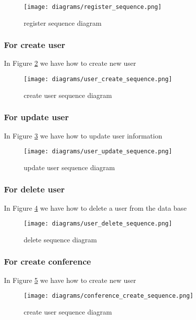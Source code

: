 		\begin{figure}[b]
			\centering
			\texttt{[image: diagrams/register\_sequence.png]}
			\caption{register sequence diagram}
			\label{fig:register-s-d}
		\end{figure}
	
	\subsubsection{For create user}
	In Figure \ref{fig:user-create-s-d} we have how to create new user
	
		\begin{figure}[b]
			\centering
			\texttt{[image: diagrams/user\_create\_sequence.png]}
			\caption{create user sequence diagram}
			\label{fig:user-create-s-d}
		\end{figure}
	
	\subsubsection{For update user}
	In Figure \ref{fig:user-update-s-d} we have how to update user information
	
		\begin{figure}[b]
			\centering
			\texttt{[image: diagrams/user\_update\_sequence.png]}
			\caption{update user sequence diagram}
			\label{fig:user-update-s-d}
		\end{figure}
	
	\subsubsection{For delete user}
	In Figure \ref{fig:user-delete-s-d} we have how to delete a user from the data base

		\begin{figure}[b]
			\centering
			\texttt{[image: diagrams/user\_delete\_sequence.png]}
			\caption{delete sequence diagram}
			\label{fig:user-delete-s-d}
		\end{figure}
	
	\subsubsection{For create conference}
	In Figure \ref{fig:conference-create-s-d} we have how to create new user
	
		\begin{figure}[b]
			\centering
			\texttt{[image: diagrams/conference\_create\_sequence.png]}
			\caption{create user sequence diagram}
			\label{fig:conference-create-s-d}
		\end{figure}
	
